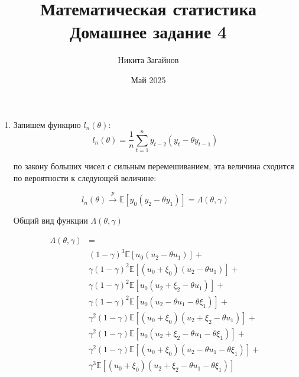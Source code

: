 \documentclass{article}
\title{Математическая статистика \\ Домашнее задание 4}
\author{Никита Загайнов}
\date{Май 2025}
\begin{document}
\maketitle

\begin{enumerate}
	\item Запишем функцию $l_n(\theta)$:
	      \[
		      l_n(\theta) = \frac{1}{n} \sum_{t=1}^{n} y_{t-2} (y_t - \theta y_{t-1})
	      \]

	      по закону больших чисел с сильным перемешиванием, эта величина сходится по вероятности к следующей величине:

	      \[
		      l_n(\theta) \xrightarrow{p} \mathbb{E} [y_0 (y_2 - \theta y_1)] = \Lambda(\theta, \gamma)
	      \]

	      Общий вид функции $\Lambda(\theta, \gamma)$

	      \begin{equation*}
		      \begin{aligned}
			      \Lambda(\theta, \gamma) & =                                                                                    \\
			                              & (1 - \gamma)^3 \mathbb{E} [u_0 (u_2 - \theta u_1)] +                                 \\
			                              & \gamma (1 - \gamma)^2 \mathbb{E} [(u_0 + \xi_0) (u_2 - \theta u_1)]         +        \\
			                              & \gamma (1 - \gamma)^2 \mathbb{E} [u_0 (u_2 + \xi_2 - \theta u_1)] +                  \\
			                              & \gamma (1 - \gamma)^2 \mathbb{E} [u_0 (u_2 - \theta u_1 - \theta \xi_1)] +           \\
			                              & \gamma^2 (1 - \gamma) \mathbb{E} [(u_0 + \xi_0) (u_2 + \xi_2 - \theta u_1)] +        \\
			                              & \gamma^2 (1 - \gamma) \mathbb{E} [u_0 (u_2 + \xi_2 - \theta u_1 - \theta \xi_1)] +   \\
			                              & \gamma^2 (1 - \gamma) \mathbb{E} [(u_0 + \xi_0) (u_2 - \theta u_1 - \theta \xi_1)] + \\
			                              & \gamma^3  \mathbb{E} [(u_0 + \xi_0) (u_2 + \xi_2 - \theta u_1 - \theta \xi_1)]       \\
		      \end{aligned}
	      \end{equation*}


\end{enumerate}
\end{document}
